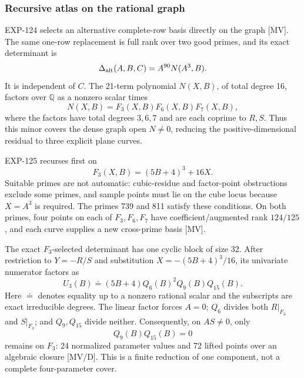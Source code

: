 \documentclass[11pt]{article}
\theoremstyle{remark}
\newcommand{\Q}{\mathbb{Q}}
\begin{document}
\subsubsection{Recursive atlas on the rational graph}

EXP-124 selects an alternative complete-row basis directly on the graph
[MV]. The same one-row replacement is full rank over two good primes, and
its exact determinant is
\[
 \Delta_{\rm alt}(A,B,C)=A^{90}N(A^3,B).
\]
It is independent of \(C\). The 21-term polynomial \(N(X,B)\), of total
degree 16, factors over \(\Q\) as a nonzero scalar times
\[
 N(X,B)=F_3(X,B)F_6(X,B)F_7(X,B),
\]
where the factors have total degrees \(3,6,7\) and are each coprime to
\(R,S\). Thus this minor covers the dense graph open \(N\ne0\), reducing the
positive-dimensional residual to three explicit plane curves.

EXP-125 recurses first on
\[
 F_3(X,B)=(5B+4)^3+16X.
\]
Suitable primes are not automatic: cubic-residue and factor-point obstructions
exclude some primes, and sample points must lie on the cube locus because
\(X=A^3\) is required. The primes 739 and 811 satisfy these conditions. On both primes,
four points on each of \(F_3,F_6,F_7\) have coefficient/augmented rank
\(124/125\), and each curve supplies a new cross-prime basis [MV].

The exact \(F_3\)-selected determinant has one cyclic block of size 32. After
restriction to \(Y=-R/S\) and substitution
\(X=-(5B+4)^3/16\), its univariate numerator factors as
\[
 U_3(B)\doteq(5B+4)Q_6(B)^2Q_9(B)Q_{15}(B).
\]
Here \(\doteq\) denotes equality up to a nonzero rational scalar and the
subscripts are exact irreducible degrees. The linear factor forces \(A=0\);
\(Q_6\) divides both \(R|_{F_3}\) and \(S|_{F_3}\); and \(Q_9,Q_{15}\)
divide neither. Consequently, on \(AS\ne0\), only
\[
 Q_9(B)Q_{15}(B)=0
\]
remains on \(F_3\): 24 normalized parameter values and 72 lifted points over
an algebraic closure [MV/D]. This is a finite reduction of one component,
not a complete four-parameter cover.
\end{document}
